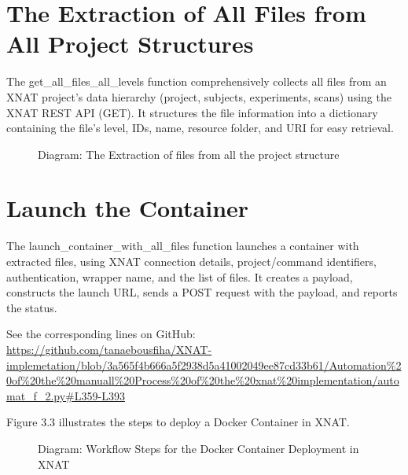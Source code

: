 \section{The Extraction of All Files from All Project Structures}

The get\_all\_files\_all\_levels function comprehensively collects all files from an XNAT project's data hierarchy (project, subjects, experiments, scans) using the XNAT REST API (GET). It structures the file information into a dictionary containing the file's level, IDs, name, resource folder, and URI for easy retrieval.

\begin{figure}[ht]
    \centering
    \def\svgwidth{0.9\linewidth}
    
    \caption{Diagram: The Extraction of files from all the project structure}
    \label{fig:enter-label}
\end{figure}

\section{Launch the Container}

The launch\_container\_with\_all\_files function launches a container with extracted files, using XNAT connection details, project/command identifiers, authentication, wrapper name, and the list of files. It creates a payload, constructs the launch URL, sends a POST request with the payload, and reports the status.




\noindent\footnotesize See the corresponding lines on GitHub:\url{ https://github.com/tanaebousfiha/XNAT-implemetation/blob/3a565f4b666a5f2938d5a41002049ee87cd33b61/Automation%20of%20the%20manuall%20Process%20of%20the%20xnat%20implementation/automat_f_2.py#L359-L393}




Figure 3.3 illustrates the steps to deploy a Docker Container in XNAT.


\begin{figure}[ht]
    \centering
    \def\svgwidth{0.9\linewidth}
    
    \caption{Diagram: Workflow Steps for the Docker Container Deployment in XNAT}
    \label{fig:workflow-steps}
\end{figure}


